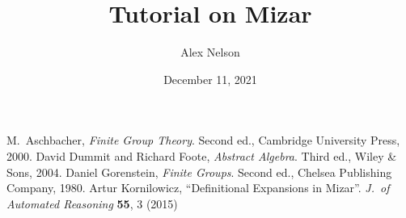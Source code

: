 \documentclass[oneside]{book}
\title{Tutorial on Mizar}
\author{Alex Nelson}
\date{December 11, 2021}
\begin{document}



\begin{thebibliography}{99}
  M.~Aschbacher,
  \emph{Finite Group Theory}.
  Second ed., Cambridge University Press, 2000.
  David Dummit and Richard Foote,
  \emph{Abstract Algebra}.
  Third ed., Wiley \& Sons, 2004.
  Daniel Gorenstein,
  \emph{Finite Groups}.
  Second ed., Chelsea Publishing Company, 1980.
  Artur Kornilowicz,
  ``Definitional Expansions in Mizar''.
  \emph{J.~of Automated Reasoning} \textbf{55}, 3 (2015)
  
\end{thebibliography}
\end{document}

